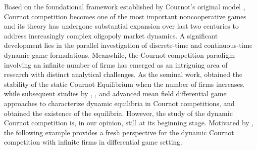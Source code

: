 \documentclass[10pt]{article}
\begin{document}
Based on the foundational framework established by Cournot's original model \citep{cournot1838recherches}, Cournot competition becomes one of the most important noncooperative games and its theory has undergone substantial expansion over last two centuries to address increasingly complex oligopoly market dynamics.   A significant development lies in the parallel investigation of discrete-time \citep{acciaio2021cournot, backhoff2023dynamic, MR2917530, wang2024stability} and continuous-time \citep{MR4815584, gori2015continuous, martinez2022payoff, MR4426096} dynamic game formulations.  Meanwhile, the Cournot competition paradigm involving an infinite number of firms has emerged as an intriguing area of research with distinct analytical challenges.  As the seminal work, \citet{puu2008stability} obtained the stability  of the static Cournot Equilibrium when the number of firms increases, while subsequent studies by  \citet{chan2015bertrand},   \citet{MR3755719}, and  \citet{graber2021nonlocal} advanced mean field differential game approaches to characterize dynamic equilibria in    Cournot competitions, and obtained the existence of the equilibria.  However, the study of the dynamic Cournot competition is, in our opinion, still at its beginning stage. Motivated by \citep[Example 3.1.3]{MR2560519}, the following example provides a fresh perspective for the dynamic Cournot competition with infinite firms in differential game setting.
\end{document}
